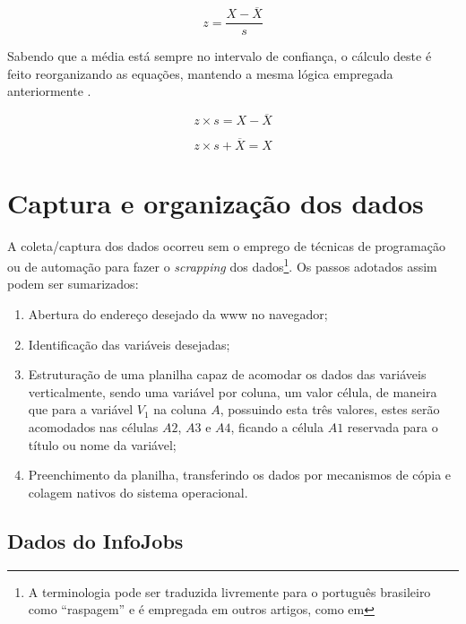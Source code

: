 	\begin{equation}
	    \label{eq:escoresz}
	    z = \dfrac{X - \overline{X}}{s}
	\end{equation}
	
	Sabendo que a média está sempre no intervalo de confiança, o cálculo deste é feito reorganizando as equações, mantendo a mesma lógica empregada anteriormente \cite[p. 47]{field2009}.
	
	\begin{equation}
	    z \times s = X - \overline{X}
	\end{equation}
	
	\begin{equation}
	    z \times s + \overline{X} = X
	\end{equation}
	
	\section{Captura e organização dos dados}

	A coleta/captura dos dados ocorreu sem o emprego de técnicas de programação ou de automação para fazer o \textit{scrapping} dos dados\footnote{A terminologia pode ser traduzida livremente para o português brasileiro como ``raspagem'' e é empregada em outros artigos, como em }. Os passos adotados assim podem ser sumarizados:
	
	\begin{enumerate}
	    \item Abertura do endereço desejado da \gls{www} no navegador;
	    \item Identificação das variáveis desejadas;
	    \item Estruturação de uma planilha capaz de acomodar os dados das variáveis verticalmente, sendo uma variável por coluna, um valor célula, de maneira que para a variável $V_1$ na coluna $A$, possuindo esta três valores, estes serão acomodados nas células $A2$, $A3$ e $A4$, ficando a célula $A1$ reservada para o título ou nome da variável;
	    \item Preenchimento da planilha, transferindo os dados por mecanismos de cópia e colagem nativos do sistema operacional.
	\end{enumerate}
	
	\subsection{Dados do InfoJobs}
	
